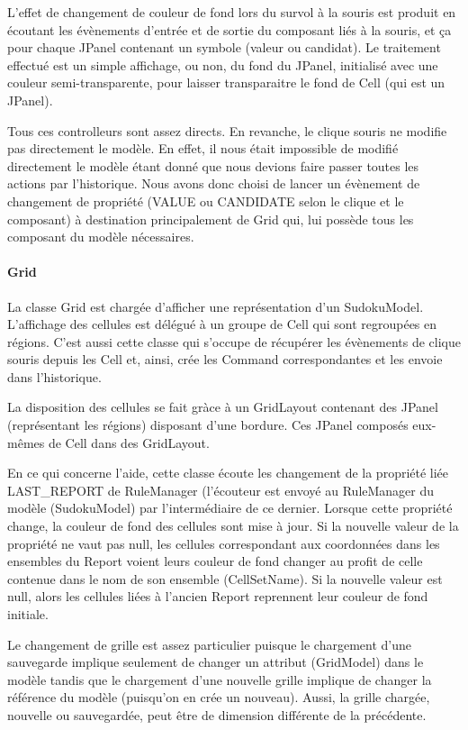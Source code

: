 L'effet de changement de couleur de fond lors du survol à la souris est produit
en écoutant les évènements d'entrée et de sortie du composant liés à la souris,
et ça pour chaque JPanel contenant un symbole (valeur ou candidat). Le traitement
effectué est un simple affichage, ou non, du fond du JPanel, initialisé avec une
couleur semi-transparente, pour laisser transparaitre le fond de Cell (qui est
un JPanel).

Tous ces controlleurs sont assez directs. En revanche, le clique souris ne
modifie pas directement le modèle. En effet, il nous était impossible de modifié
directement le modèle étant donné que nous devions faire passer toutes les actions
par l'historique. Nous avons donc choisi de lancer un évènement de changement de
propriété (VALUE ou CANDIDATE selon le clique et le composant) à destination
principalement de Grid qui, lui possède tous les composant du modèle nécessaires.

\paragraph{Grid}
    
La classe Grid est chargée d'afficher une représentation d'un SudokuModel.
L'affichage des cellules est délégué à un groupe de Cell qui sont regroupées en
régions. C'est aussi cette classe qui s'occupe de récupérer les évènements de
clique souris depuis les Cell et, ainsi, crée les Command correspondantes et les
envoie dans l'historique.

La disposition des cellules se fait gràce à un GridLayout contenant des JPanel
(représentant les régions) disposant d'une bordure. Ces JPanel composés eux-mêmes
de Cell dans des GridLayout.

En ce qui concerne l'aide, cette classe écoute les changement de la propriété liée
LAST\_REPORT de RuleManager (l'écouteur est envoyé au RuleManager du modèle (SudokuModel)
par l'intermédiaire de ce dernier. Lorsque cette propriété change, la couleur de fond
des cellules sont mise à jour. Si la nouvelle valeur de la propriété ne vaut pas null,
les cellules correspondant aux coordonnées dans les ensembles du Report voient leurs
couleur de fond changer au profit de celle contenue dans le nom de son ensemble
(CellSetName). Si la nouvelle valeur est null, alors les cellules liées à l'ancien
Report reprennent leur couleur de fond initiale.

Le changement de grille est assez particulier puisque le chargement d'une sauvegarde
implique seulement de changer un attribut (GridModel) dans le modèle tandis que 
le chargement d'une nouvelle grille implique de changer la référence du modèle
(puisqu'on en crée un nouveau). Aussi, la grille chargée, nouvelle ou sauvegardée,
peut être de dimension différente de la précédente.

